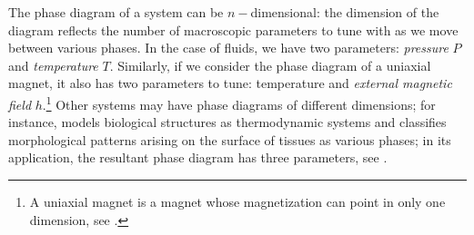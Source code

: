 \documentclass[12pt]{article}
\numberwithin{equation}{section}
\begin{document}
The phase diagram of a system can be $n-$dimensional: the dimension of the diagram reflects the number of macroscopic parameters to tune with as we move between various phases. In the case of fluids, we have two parameters: \emph{pressure} $P$ and \emph{temperature} $T$. Similarly, if we consider the phase diagram of a uniaxial magnet, it also has two parameters to tune: temperature and \emph{external magnetic field} $h$.\footnote{A uniaxial magnet is a magnet whose magnetization can point in only one dimension, see \figref{\ref{fig:Ising model}}.} Other systems may have phase diagrams of different dimensions; for instance, \cite{wang2015three} models biological structures as thermodynamic systems and classifies morphological patterns arising on the surface of  tissues as various phases; in its application, the resultant phase diagram has three parameters, see \figref{\ref{fig: phase diagram 2}}.
\end{document}
